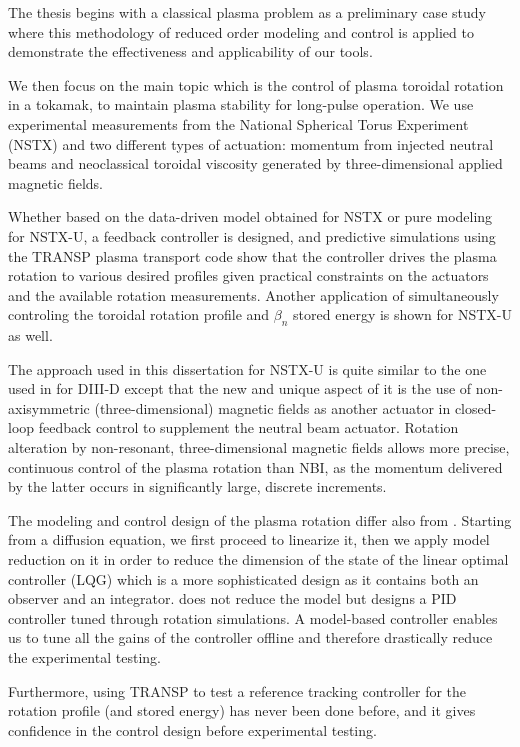 \documentclass[12pt,lot, lof]{puthesis}
\begin{document}
The thesis begins with a classical plasma problem as a preliminary case study where this methodology of reduced order modeling and control is applied to demonstrate the effectiveness and applicability of our tools. 

We then focus on the main topic which is the control of plasma toroidal rotation in a tokamak, to maintain plasma stability for long-pulse operation. We use experimental measurements from the National Spherical Torus Experiment (NSTX) and two different types of actuation: momentum from injected neutral beams and neoclassical toroidal viscosity generated by three-dimensional applied magnetic fields. 

Whether based on the data-driven model obtained for NSTX or pure modeling for NSTX-U, a feedback controller is designed, and predictive simulations using the TRANSP plasma transport code show that the controller drives the plasma rotation to various desired profiles given practical constraints on the actuators and the available rotation measurements. Another application of simultaneously controling the toroidal rotation profile and $\beta_n$ stored energy is shown for NSTX-U as well. 

The approach used in this dissertation for NSTX-U is quite similar to the one used in \cite{Scoville07} for DIII-D  except that the new and unique aspect of it is the use of non-axisymmetric (three-dimensional) magnetic fields as another actuator in closed-loop feedback control to supplement the neutral beam actuator. Rotation alteration by non-resonant, three-dimensional magnetic fields allows more precise, continuous control of the plasma rotation than NBI, as the momentum delivered by the latter occurs in significantly large, discrete increments.

The modeling and control design of the plasma rotation differ also from \cite{Scoville07}. Starting from a diffusion equation, we first proceed to linearize it, then we apply model reduction on it in order to reduce the dimension of the state of the linear optimal controller (LQG) which is a more sophisticated design as it contains both an observer and an integrator. \cite{Scoville07} does not reduce the model but designs a PID controller tuned through rotation simulations. A model-based controller enables us to tune all the gains of the controller offline and therefore drastically reduce the experimental testing.

Furthermore, using TRANSP to test a reference tracking controller for the rotation profile (and stored energy) has never been done before, and it gives confidence in the control design before experimental testing.
\end{document}
